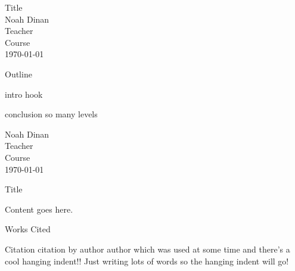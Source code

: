 \documentclass[12pt]{article}
\begin{document}
\begin{center}
\vspace*{\fill}
Title \\ Noah Dinan \\ Teacher \\ Course \\ \today \\
\vspace*{\fill}
\end{center}

\newpage
{} %

\begin{center}
Outline
\end{center}

\begin{outline}[enumerate]

\1 intro
    \2 hook

\1 conclusion
    \2 so
        \3 many
            \4 levels

\end{outline}

\newpage
\noindent
Noah Dinan \\ Teacher \\ Course \\ \today \\

\begin{center}
Title
\end{center}

\setlength{\parindent}{0.5in}

Content goes here.

\newpage

\begin{center}
Works Cited
\end{center}

\begin{hangparas}{0.5in}{1}

Citation citation by author author which was used at some time and there's a cool hanging indent!!
Just writing lots of words so the hanging indent will go!

\end{hangparas}
\end{document}
